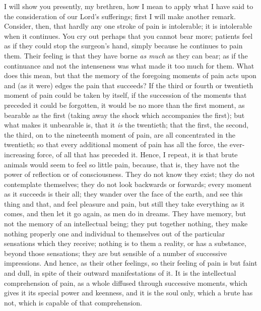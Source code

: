 I will show you presently, my brethren, how I mean to apply what I
have said to the consideration of our Lord's sufferings; first I will
make another remark. Consider, then, that hardly any one stroke of
pain is intolerable; it is intolerable when it continues. You cry out
perhaps that you cannot bear more; patients feel as if they could stop
the surgeon's hand, simply because he continues to pain them. Their
feeling is that they have borne \emph{as much} as they can bear; as if
the continuance and not the intenseness was what made it too much for
them. What does this mean, but that the memory of the foregoing
moments of pain acts upon and (as it were) edges the pain that
succeeds? If the third or fourth or twentieth moment of pain could be
taken by itself, if the succession of the moments that preceded it
could be forgotten, it would be no more than the first moment, as
bearable as the first (taking away the shock which accompanies the
first); but what makes it unbearable is, that it \emph{is} the twentieth;
that the first, the second, the third, on to the nineteenth moment of
pain, are all concentrated in the twentieth; so that every additional
moment of pain has all the force, the ever-increasing force, of all
that has preceded it. Hence, I repeat, it is that brute animals would
seem to feel so little pain, because, that is, they have not the power
of reflection or of consciousness. They do not know they exist; they
do not contemplate themselves; they do not look backwards or forwards;
every moment as it succeeds is their all; they wander over the face of
the earth, and see this thing and that, and feel pleasure and pain,
but still they take everything as it comes, and then let it go again,
as men do in dreams. They have memory, but not the memory of an
intellectual being; they put together nothing, they make nothing
properly one and individual to themselves out of the particular
sensations which they receive; nothing is to them a reality, or has a
substance, beyond those sensations; they are but sensible of a number
of successive impressions. And hence, as their other feelings, so
their feeling of pain is but faint and dull, in spite of their outward
manifestations of it. It is the intellectual comprehension of pain, as
a whole diffused through successive moments, which gives it its
special power and keenness, and it is the soul only, which a brute has
not, which is capable of that comprehension.

